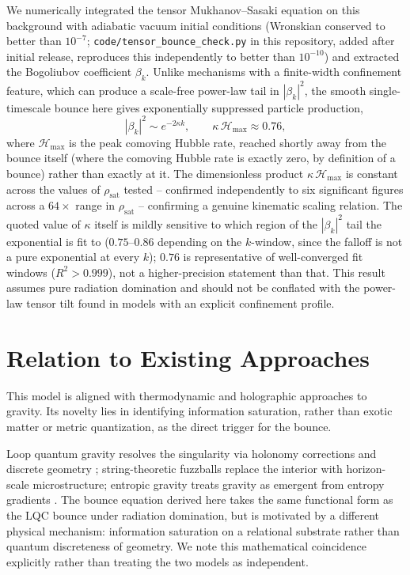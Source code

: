 \documentclass[onecolumn,PRD,amsmath,amssymb,aps,nofootinbib,superscriptaddress,11pt]{revtex4-2}
\begin{document}
We numerically integrated the tensor Mukhanov--Sasaki equation on this background with adiabatic vacuum initial conditions (Wronskian conserved to better than $10^{-7}$; \texttt{code/tensor\_\allowbreak bounce\_\allowbreak check.py} in this repository, added after initial release, reproduces this independently to better than $10^{-10}$) and extracted the Bogoliubov coefficient $\beta_k$. Unlike mechanisms with a finite-width confinement feature, which can produce a scale-free power-law tail in $|\beta_k|^2$, the smooth single-timescale bounce here gives exponentially suppressed particle production,
\begin{equation}
|\beta_k|^2 \sim e^{-2\kappa k}, \qquad \kappa\,\mathcal{H}_{\max} \approx 0.76,
\end{equation}
where $\mathcal{H}_{\max}$ is the peak comoving Hubble rate, reached shortly away from the bounce itself (where the comoving Hubble rate is exactly zero, by definition of a bounce) rather than exactly at it. The dimensionless product $\kappa\,\mathcal{H}_{\max}$ is constant across the values of $\rho_{\text{sat}}$ tested -- confirmed independently to six significant figures across a $64\times$ range in $\rho_{\text{sat}}$ -- confirming a genuine kinematic scaling relation. The quoted value of $\kappa$ itself is mildly sensitive to which region of the $|\beta_k|^2$ tail the exponential is fit to ($0.75$--$0.86$ depending on the $k$-window, since the falloff is not a pure exponential at every $k$); $0.76$ is representative of well-converged fit windows ($R^2>0.999$), not a higher-precision statement than that. This result assumes pure radiation domination and should not be conflated with the power-law tensor tilt found in models with an explicit confinement profile.

\section{Relation to Existing Approaches}
This model is aligned with thermodynamic and holographic approaches to gravity. Its novelty lies in identifying information saturation, rather than exotic matter or metric quantization, as the direct trigger for the bounce.

Loop quantum gravity resolves the singularity via holonomy corrections and discrete geometry \cite{Ashtekar2006}; string-theoretic fuzzballs replace the interior with horizon-scale microstructure; entropic gravity treats gravity as emergent from entropy gradients \cite{Verlinde2011}. The bounce equation derived here takes the same functional form as the LQC bounce under radiation domination, but is motivated by a different physical mechanism: information saturation on a relational substrate rather than quantum discreteness of geometry. We note this mathematical coincidence explicitly rather than treating the two models as independent.
\end{document}
